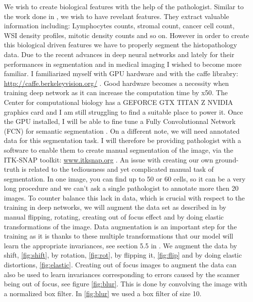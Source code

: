 \documentclass[a4paper,10pt]{article}
\begin{document}
We wish to create biological features with the help of the
pathologist. Similar to the work done in \citet{yuan2012quantitative},
we wish to have revelant features. They extract valuable information
including: Lymphocytes counts, stromal count, cancer cell count, WSI
density profiles, mitotic density counts and so on. However in order
to create this biological driven features we have to properly segment
the histopathology data. Due to the recent advances in deep neural
networks and lately for their performances in segmentation and in
medical imaging \citep{UNet,long2015fcn} I wished to become more
familiar. I familiarized myself with GPU hardware and with the caffe
librabry: \url{http://caffe.berkeleyvision.org/}
\citep{jia2014caffe}. Good hardware becomes a necessity when training
deep network as it can increase the computation time by x50. The
Center for computational biology has a GEFORCE GTX TITAN Z NVIDIA
graphics card and I am still struggling to find a suitable place to
power it. 
Once the GPU installed, I will be able to fine tune a Fully
Convolutionnal Network (FCN) for semantic segmentation
\citep{long2015fcn}. On a different note, we will need annotated data
for this segmentation task. I will therefore be providing pathologist
with a software to enable them to create manual segmentation of the
image, via the ITK-SNAP toolkit: \url{www.itksnap.org}
\citep{py06nimg}. An issue with creating our own ground-truth is
related to the tediousness and yet complicated manual task of
segmentation. In one image, you can find up to 50 or 60 cells, so it
can be a very long procedure and we can't ask a single pathologist to
annotate more then 20 images. To counter balance this lack in data,
which is crucial with respect to the training in deep networks, we
will augment the data set as described in \citet{UNet} by manual
flipping, rotating, creating out of focus effect and by doing elastic
transformations of the image. Data augmentation is an important step
for the training as it is thanks to these multiple transformations
that our model will learn the appropriate invariances,  see section
5.5 in \citep{bishop2006pattern}. We augment the data by shift,
\ref{fig:shift}, by rotation, \ref{fig:rot}, by flipping it,
\ref{fig:flip} and by doing elastic distortions,
\ref{fig:elastic}. Creating out of focus images to augment the data
can also be used to learn invariances corresponding to errors caused
by the scanner being out of focus, see figure \ref{fig:blur}. This is
done by convolving the image with a normalized box filter. In
\ref{fig:blur} we used a box filter of size 10.  
\end{document}

